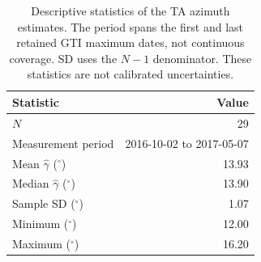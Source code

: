 \begin{table}[htbp]
\centering
\small
\caption{Descriptive statistics of the TA azimuth estimates. The period spans the first and last retained GTI maximum dates, not continuous coverage. SD uses the $N-1$ denominator. These statistics are not calibrated uncertainties.}
\label{tab:ta-descriptive}
\begin{tabular}{lr}
\toprule
Statistic & Value \\
\midrule
$N$ & 29 \\
Measurement period & 2016-10-02 to 2017-05-07 \\
Mean $\hat{\gamma}$ ($^\circ$) & 13.93 \\
Median $\hat{\gamma}$ ($^\circ$) & 13.90 \\
Sample SD ($^\circ$) & 1.07 \\
Minimum ($^\circ$) & 12.00 \\
Maximum ($^\circ$) & 16.20 \\
\bottomrule
\end{tabular}
\end{table}

